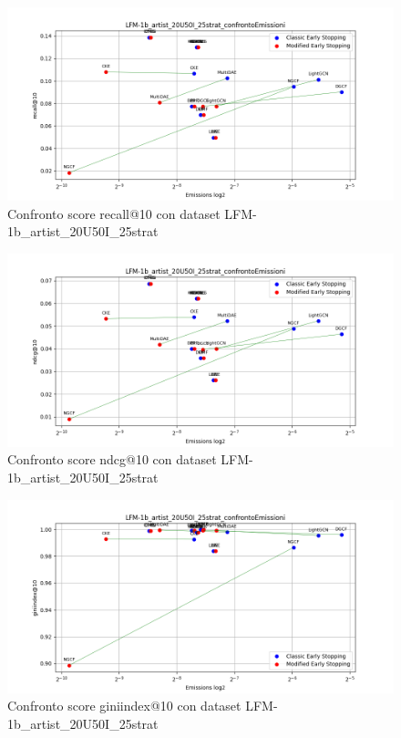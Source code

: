 \begin{figure}[H]
    \centering
    \includegraphics[width=\linewidth, trim=0 0 0 0]{images/recall@10_LFM-1b_artist_20U50I_25strat_comparison.png}
    \caption{Confronto score recall@10 con dataset LFM-1b\_artist\_20U50I\_25strat}
    
\end{figure}

\begin{figure}[H]
    \centering
    \includegraphics[width=\linewidth, trim=0 0 0 0]{images/ndcg@10_LFM-1b_artist_20U50I_25strat_comparison.png}
    \caption{Confronto score ndcg@10 con dataset LFM-1b\_artist\_20U50I\_25strat}
    
\end{figure}

\begin{figure}[H]
    \centering
    \includegraphics[width=\linewidth, trim=0 0 0 0]{images/giniindex@10_LFM-1b_artist_20U50I_25strat_comparison.png}
    \caption{Confronto score giniindex@10 con dataset LFM-1b\_artist\_20U50I\_25strat}
\end{figure}

